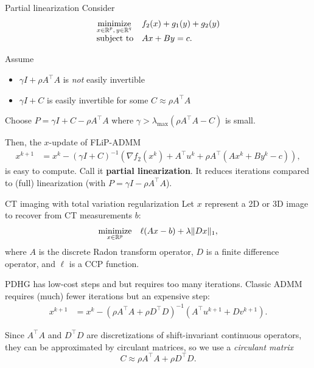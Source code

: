 \documentclass[10pt,mathserif]{beamer}
\begin{document}
\begin{frame}{Partial linearization}
Consider 
\[
\begin{array}{ll}
\underset{\substack{x\in \mathbb{R}^p,\,y\in \mathbb{R}^q}}{\mbox{minimize}}&f_2(x)+g_1(y)+g_2(y)\\
\mbox{subject to}&Ax+By=c.
\end{array}
\]

Assume 
\begin{itemize}
  \item $\gamma I+\rho A^\intercal  A$ is \emph{not} easily invertible
  \item $\gamma I+C$ is easily invertible for some $C\approx \rho A^\intercal  A$
\end{itemize}
\medskip

Choose $P=\gamma I+C -\rho A^\intercal  A$ where $\gamma>\lambda_\mathrm{max}(\rho A^\intercal  A-C)$ is small.
\medskip

Then, the $x$-update of FLiP-ADMM
\begin{align*}
x^{k+1}&=x^k-(\gamma I+C)^{-1} (\nabla f_2(x^k)+A^\intercal  u^k+\rho A^\intercal (Ax^k+By^k-c)),
\end{align*}
is easy to compute. Call it \textbf{partial linearization}. It reduces iterations compared to (full) linearization (with $P=\gamma I-\rho A^\intercal  A$).
\end{frame}


\begin{frame}{CT imaging with total variation regularization}
Let $x$ represent a 2D or 3D image to recover from CT measurements $b$:
\[
    \begin{array}{ll}
    \underset{x\in \mathbb{R}^p}{\mbox{minimize}}&\displaystyle{\ell(Ax-b)+\lambda \|Dx\|_1},
    \end{array}
\]
where $A$ is the discrete Radon transform operator, $D$ is a finite difference operator, and $\ell$ is a CCP function.
\medskip

PDHG has low-cost steps and but requires too many iterations. Classic ADMM requires (much) fewer iterations but an expensive step:
\begin{align*}
  x^{k+1}&=x^k-(\rho A^\intercal  A+\rho D^\intercal  D)^{-1}\left(A^\intercal  u^{k+1}+ D v^{k+1}\right).
\end{align*}


Since $A^\intercal  A$ and $D^\intercal  D$ are discretizations of shift-invariant continuous operators, they can be approximated by circulant matrices, so we use a \emph{circulant matrix}
\[
C \approx \rho A^\intercal  A + \rho D^\intercal  D.
\]
\end{frame}
\end{document}
